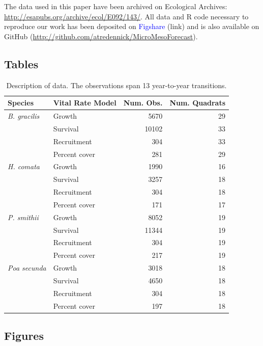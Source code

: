 \documentclass[12pt,]{article}
\begin{document}
The data used in this paper have been archived on Ecological Archives:
\url{http://esapubs.org/archive/ecol/E092/143/}. All data and R code
necessary to reproduce our work has been deposited on
\textcolor{blue}{Figshare} (link) and is also available on GitHub
(\url{http://github.com/atredennick/MicroMesoForecast}).

\pagebreak{}

\subsection{Tables}\label{tables}

\begin{table}[ht]
\centering
\caption{Description of data. The observations span 13 year-to-year transitions.} 
\begin{tabular}{llrr}
  \hline
Species & Vital Rate Model & Num. Obs. & Num. Quadrats\\ 
  \hline
  \emph{B. gracilis} & Growth & 5670 & 29 \\ 
       & Survival & 10102 & 33 \\ 
       & Recruitment & 304 & 33 \\ 
       & Percent cover & 281 & 29 \\ 
  \rule{0pt}{3ex} \emph{H. comata} & Growth & 1990 & 16 \\ 
       & Survival & 3257 & 18 \\ 
       & Recruitment & 304 & 18 \\ 
       & Percent cover & 171 & 17 \\ 
  \rule{0pt}{3ex} \emph{P. smithii} & Growth & 8052 & 19 \\ 
       & Survival & 11344 & 19 \\ 
       & Recruitment & 304 & 19 \\ 
       & Percent cover & 217 & 19 \\ 
  \rule{0pt}{3ex} \emph{Poa secunda} & Growth & 3018 & 18 \\ 
       & Survival & 4650 & 18 \\ 
       & Recruitment & 304 & 18 \\ 
       & Percent cover & 197 & 18 \\ 
   \hline
\end{tabular}
\end{table}

\newpage{}

\subsection{Figures}\label{figures}
\end{document}
